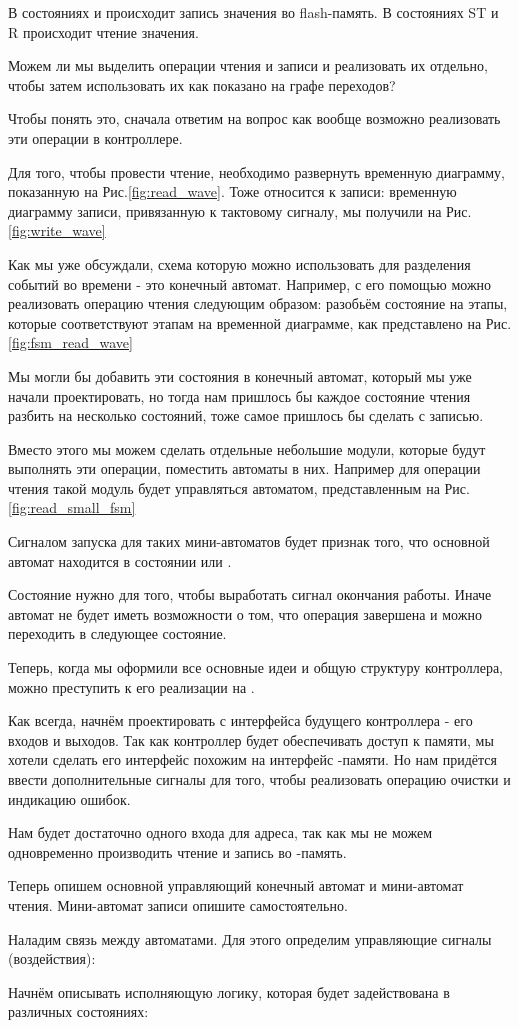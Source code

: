 \par{В состояниях  и  происходит запись значения во flash-память. В состояниях ST и R происходит чтение значения.}
\par{Можем ли мы выделить операции чтения и записи и реализовать их отдельно, чтобы затем использовать их как показано на графе переходов?}
\par{Чтобы понять это, сначала ответим на вопрос как вообще возможно реализовать эти операции в контроллере.}
\par{Для того, чтобы провести чтение, необходимо развернуть временную диаграмму, показанную на Рис.\ref{fig:read_wave}. Тоже относится к записи: временную диаграмму записи, привязанную к тактовому сигналу, мы получили на Рис. \ref{fig:write_wave}}
\par{Как мы уже обсуждали, схема которую можно использовать для разделения событий во времени - это конечный автомат. Например, с его помощью можно реализовать операцию чтения следующим образом: разобьём состояние  на этапы, которые соответствуют этапам на временной диаграмме, как представлено на Рис.\ref{fig:fsm_read_wave}}
\par{Мы могли бы добавить эти состояния в конечный автомат, который мы уже начали проектировать, но тогда нам пришлось бы каждое состояние чтения разбить на несколько состояний, тоже самое пришлось бы сделать с записью.}
\par{Вместо этого мы можем сделать отдельные небольшие модули, которые будут выполнять эти операции, поместить автоматы в них. Например для операции чтения такой модуль будет управляться автоматом, представленным на Рис.\ref{fig:read_small_fsm}}
\par{Сигналом запуска для таких мини-автоматов будет признак того, что основной автомат находится в состоянии  или .}
\par{Состояние  нужно для того, чтобы выработать сигнал окончания работы. Иначе  автомат не будет иметь возможности  о том, что операция завершена и можно переходить в следующее состояние.}
\par{Теперь, когда мы оформили все основные идеи и общую структуру контроллера, можно преступить к его реализации на .}
\par{Как всегда, начнём проектировать с интерфейса будущего контроллера - его входов и выходов. Так как контроллер будет обеспечивать доступ к памяти, мы хотели сделать его интерфейс похожим на интерфейс -памяти. Но нам придётся ввести дополнительные сигналы для того, чтобы реализовать операцию очистки и индикацию ошибок.}
\par{Нам будет достаточно одного входа для адреса, так как мы не можем одновременно производить чтение и запись во -память.}
\par{Теперь опишем основной управляющий конечный автомат и мини-автомат чтения. Мини-автомат записи опишите самостоятельно.}
\par{Наладим связь между автоматами. Для этого определим управляющие сигналы (воздействия):}
\par{Начнём описывать исполняющую логику, которая будет задействована в различных состояниях:}
